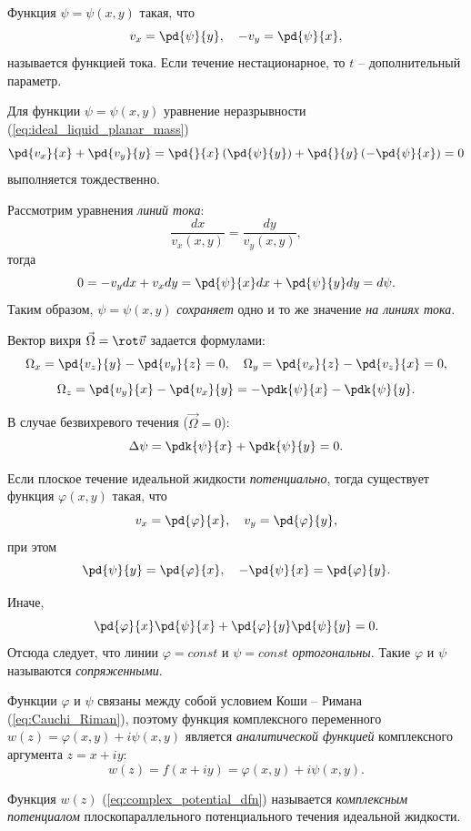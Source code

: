 \documentclass[14pt]{extarticle}
\begin{document}
\begin{dfn}
	Функция $\psi=\psi(x,y)$ такая, что 
	\[
	v_x = \pd{\psi}{y},\quad
	-v_y = \pd{\psi}{x},
	\]
	называется функцией тока. Если течение нестационарное, то $t$ -- дополнительный параметр.
\end{dfn}

Для функции $\psi = \psi(x,y)$ уравнение неразрывности (\ref{eq:ideal_liquid_planar_mass})
\[
	\pd{v_x}{x} + \pd{v_y}{y} = 
	\pd{}{x} \left( \pd{\psi}{y} \right) + \pd{}{y} \left( -\pd{\psi}{x} \right) = 0
\]
выполняется тождественно.


Рассмотрим уравнения \textit{линий тока}:
\[
	\frac{dx}{v_x(x,y)} = \frac{dy}{v_y(x,y)},
\]
тогда
\[
0 = -v_y dx + v_x dy = \pd{\psi}{x} dx + \pd{\psi}{y} dy =  d\psi.
\]
Таким образом, $\psi=\psi(x,y)$ \textit{сохраняет} одно и то же значение \textit{на линиях тока}.
		
Вектор вихря $\vec{\Omega}= \rot \vec{v}$ задается формулами:
\[
	\Omega_x = \pd{v_z}{y}-\pd{v_y}{z} = 0,\quad
	\Omega_y = \pd{v_x}{z}-\pd{v_z}{x} = 0,
\]
\[
	\Omega_z = \pd{v_y}{x}-\pd{v_x}{y} = -\pdk{\psi}{x} - \pdk{\psi}{y}.
\]
		
В случае безвихревого течения ($\vec{\Omega} = 0$):
\[
	\Delta \psi = \pdk{\psi}{x} + \pdk{\psi}{y} = 0.
\]


Если плоское течение идеальной жидкости \textit{потенциально}, тогда существует функция $\varphi(x,y)$ такая, что
\[
	v_x = \pd{\varphi}{x},\quad
	v_y = \pd{\varphi}{y}, 
\]
при этом
\begin{equation}
	\label{eq:Cauchi_Riman}
	\pd{\psi}{y} = \pd{\varphi}{x},\quad
	-\pd{\psi}{x} = \pd{\varphi}{y}.
\end{equation}
	
Иначе,
\[
\pd{\varphi}{x}\pd{\psi}{x} + \pd{\varphi}{y}\pd{\psi}{y} = 0.
\]
Отсюда следует, что линии $\varphi=const$ и $\psi=const$ \textit{ортогональны}. Такие $\varphi$ и $\psi$ называются \textit{сопряженными}.
		
	
Функции $\varphi$ и $\psi$ связаны между собой условием Коши -- Римана (\ref{eq:Cauchi_Riman}), поэтому функция комплексного переменного $w(z) = \varphi(x,y) + i \psi(x,y)$ является \textit{аналитической функцией} комплексного аргумента $z = x + i y$:
\begin{equation}
	\label{eq:complex_potential_dfn}
	w(z) = f(x+iy) = \varphi(x,y) + i  \psi(x,y).
\end{equation}

\begin{dfn}
	Функция $w(z)$ (\ref{eq:complex_potential_dfn}) называется \textit{комплексным потенциалом} плоскопараллельного потенциального течения идеальной жидкости.
\end{dfn}			
		
\end{document}
